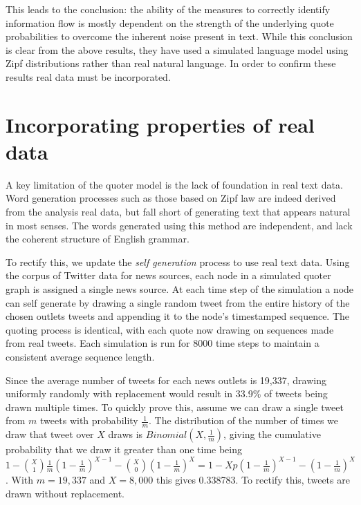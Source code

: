 This leads to the conclusion: the ability of the measures to correctly identify information flow is mostly dependent on the strength of the underlying quote probabilities to overcome the inherent noise present in text. While this conclusion is clear from the above results, they have used a simulated language model using Zipf distributions rather than real natural language. In order to confirm these results real data must be incorporated.


\section{Incorporating properties of real data}
A key limitation of the quoter model is the lack of foundation in real text data. Word generation processes such as those based on Zipf law are indeed derived from the analysis real data, but fall short of generating text that appears natural in most senses. The words generated using this method are independent, and lack the coherent structure of English grammar.

To rectify this, we update the \emph{self generation} process to use real text data. Using the corpus of Twitter data for news sources, each node in a simulated quoter graph is assigned a single news source. At each time step of the simulation a node can self generate by drawing a single random tweet from the entire history of the chosen outlets tweets and appending it to the node's timestamped sequence. The quoting process is identical, with each quote now drawing on sequences made from real tweets. Each simulation is run for 8000 time steps to maintain a consistent average sequence length. 

Since the average number of tweets for each news outlets is 19,337, drawing uniformly randomly with replacement would result in 33.9\% of tweets being drawn multiple times. To quickly prove this, assume we can draw a single tweet from $m$ tweets with probability $\frac{1}{m}$. The distribution of the number of times we draw that tweet over $X$ draws is $Binomial(X, \frac{1}{m})$, giving the cumulative probability that we draw it greater than one time being $1-\binom{X}{1} \frac{1}{m}(1-\frac{1}{m})^{X-1} - \binom{X}{0} (1-\frac{1}{m})^X = 1- Xp(1-\frac{1}{m})^{X-1} - (1-\frac{1}{m})^X$. With $m=19,337$ and $X=8,000$ this gives 0.338783. To rectify this, tweets are drawn without replacement. 

